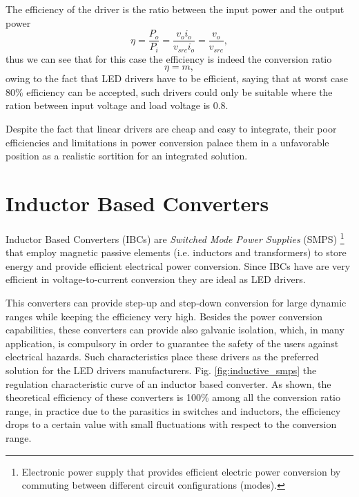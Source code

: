    The efficiency of the driver is the ratio between the input power and the output power
   \begin{equation}
        \eta = \frac{P_o}{P_i} = \frac{v_o i_o}{v_{src} i_o} = \frac{v_o}{v_{src}},
   \end{equation}
   thus we can see that for this case the efficiency is indeed the conversion ratio
   \begin{equation}
        \eta = m,
   \end{equation}
   owing to the fact that LED drivers have to be efficient, saying that at worst case 80\% efficiency can be accepted, such drivers could only be suitable where the ration between input voltage and load voltage is 0.8.

   Despite the fact that linear drivers are cheap and easy to integrate, their poor efficiencies and limitations in power conversion palace them in a unfavorable position as a realistic sortition for an integrated solution.

\section{Inductor Based Converters}

Inductor Based Converters (IBCs) are \emph{Switched Mode Power Supplies} (SMPS) \footnote{Electronic power supply that provides efficient electric power conversion by commuting between different circuit configurations (modes).}  that employ magnetic passive elements (i.e. inductors and transformers) to store energy and provide efficient electrical power conversion. Since IBCs have are very efficient in voltage-to-current conversion they are ideal as LED drivers.

This converters can provide step-up and step-down conversion for large dynamic ranges while keeping the efficiency very high. Besides the power conversion capabilities, these converters can provide also galvanic isolation, which, in many application, is compulsory in order to guarantee the safety of the users against electrical hazards. Such characteristics place these drivers as the preferred solution for the LED drivers manufacturers. Fig. \ref{fig:inductive_smps} the regulation characteristic curve of an inductor based converter. As shown, the theoretical efficiency of these converters is 100\% among all the conversion ratio range, in practice due to the parasitics in switches and inductors, the efficiency drops to a certain value with small fluctuations with respect to the conversion range.

